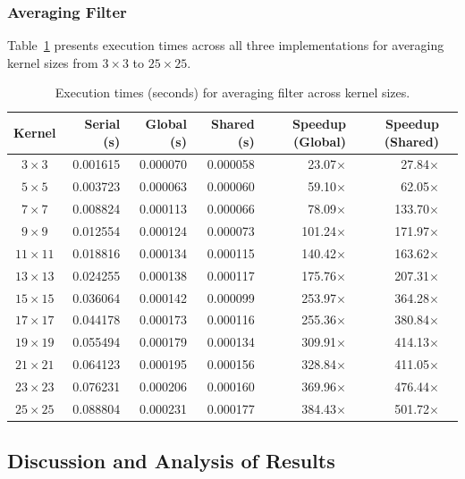 \subsubsection{Averaging Filter}

Table~\ref{tab:averaging} presents execution times across all three implementations for averaging kernel sizes from $3\times3$ to $25\times25$.

\begin{table}[h]
\centering
\caption{Execution times (seconds) for averaging filter across kernel sizes.}
\label{tab:averaging}
\begin{tabular}{crrrrrr}
\toprule
\textbf{Kernel} & \textbf{Serial (s)} & \textbf{Global (s)} & \textbf{Shared (s)} & \textbf{Speedup (Global)} & \textbf{Speedup (Shared)} \\
\midrule
$3\times3$   & 0.001615 & 0.000070 & 0.000058 & 23.07$\times$ & 27.84$\times$ \\
$5\times5$   & 0.003723 & 0.000063 & 0.000060 & 59.10$\times$ & 62.05$\times$ \\
$7\times7$   & 0.008824 & 0.000113 & 0.000066 & 78.09$\times$ & 133.70$\times$ \\
$9\times9$   & 0.012554 & 0.000124 & 0.000073 & 101.24$\times$ & 171.97$\times$ \\
$11\times11$ & 0.018816 & 0.000134 & 0.000115 & 140.42$\times$ & 163.62$\times$ \\
$13\times13$ & 0.024255 & 0.000138 & 0.000117 & 175.76$\times$ & 207.31$\times$ \\
$15\times15$ & 0.036064 & 0.000142 & 0.000099 & 253.97$\times$ & 364.28$\times$ \\
$17\times17$ & 0.044178 & 0.000173 & 0.000116 & 255.36$\times$ & 380.84$\times$ \\
$19\times19$ & 0.055494 & 0.000179 & 0.000134 & 309.91$\times$ & 414.13$\times$ \\
$21\times21$ & 0.064123 & 0.000195 & 0.000156 & 328.84$\times$ & 411.05$\times$ \\
$23\times23$ & 0.076231 & 0.000206 & 0.000160 & 369.96$\times$ & 476.44$\times$ \\
$25\times25$ & 0.088804 & 0.000231 & 0.000177 & 384.43$\times$ & 501.72$\times$ \\
\bottomrule
\end{tabular}
\end{table}

\subsection{Discussion and Analysis of Results}

